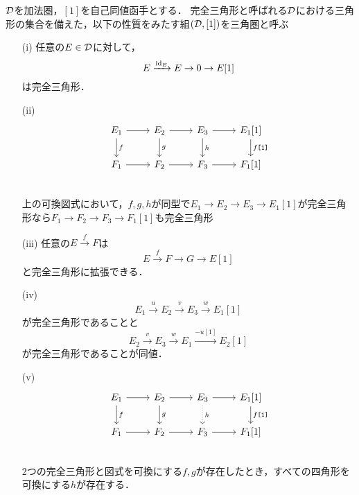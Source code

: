 \begin{defn}
	${\mathcal D}$を加法圏，$[1]$を自己同値函手とする．
	完全三角形と呼ばれる${\mathcal D}$における三角形の集合を備えた，以下の性質をみたす組$({\mathcal D},[1])$を三角圏と呼ぶ$$$$
	\vspace{-3mm}
	\begin{itemize}
		\item[(i)]
			任意の$E\in{\mathcal D}$に対して，
			\[E\xrightarrow{\mathrm{id}_E}E\rightarrow 0 \rightarrow E[1]\]
			は完全三角形．
		\item[(ii)]
			\[
		\begin{tikzcd}
			E_1\ar[r]\ar[d,"f"]& E_2\ar[r]\ar[d,"g"]& E_3\ar[r]\ar[d,"h"] & E_1[1]\ar[d,"f\texttt{[1]}"]\\
			F_1\ar[r]& F_2\ar[r]& F_3\ar[r] & F_1[1]\\
		\end{tikzcd}
			\]
			上の可換図式において，$f,g,h$が同型で$E_1\rightarrow E_2\rightarrow E_3 \rightarrow E_1[1]$が完全三角形なら$F_1\rightarrow F_2\rightarrow F_3 \rightarrow F_1[1]$も完全三角形
		\item[(iii)]
			任意の$E\xrightarrow{f}F$は
			\[E\xrightarrow{f} F\rightarrow G \rightarrow E[1]\]
		と完全三角形に拡張できる．
	\item[(iv)]
		\[
			E_1\xrightarrow{u} E_2\xrightarrow{v} E_3\xrightarrow{w}  E_1[1]
	\]
	が完全三角形であることと
	\[
		E_2\xrightarrow{v} E_3\xrightarrow{w} E_1\xrightarrow{-u[1]}  E_2[1]
	\]
	が完全三角形であることが同値．
	\item[(v)]
		\[
		\begin{tikzcd}
			E_1\ar[r]\ar[d,"f"]& E_2\ar[r]\ar[d,"g"]& E_3\ar[r]\ar[d,"h",dotted] & E_1[1]\ar[d,"f\texttt{[1]}"]\\
			F_1\ar[r]& F_2\ar[r]& F_3\ar[r] & F_1[1]\\
		\end{tikzcd}
	\]
	2つの完全三角形と図式を可換にする$f,g$が存在したとき，すべての四角形を可換にする$h$が存在する．


\end{itemize}
\end{defn}
